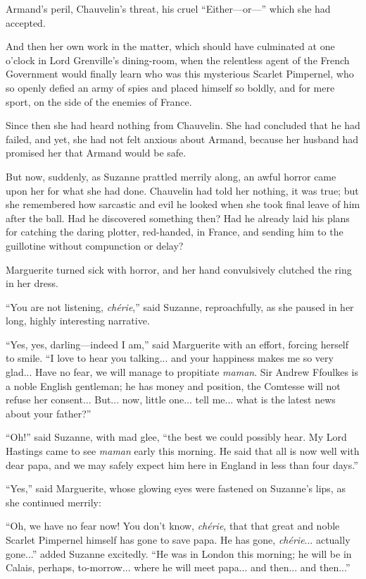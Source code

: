 \documentclass[paper=5.5in:8.5in,BCOR=7mm,twoside,DIV=calc,12pt,usegeometry,chapterprefix,endperiod,headings=big]{scrbook}
\begin{document}
Armand's peril, Chauvelin's threat, his cruel \enquote{Either---or---} which she had accepted.

And then her own work in the matter, which should have culminated at one o'clock in Lord Grenville's dining-room, when the relentless agent of the French Government would finally learn who was this mysterious Scarlet Pimpernel, who so openly defied an army of spies and placed himself so boldly, and for mere sport, on the side of the enemies of France.

Since then she had heard nothing from Chauvelin. She had concluded that he had failed, and yet, she had not felt anxious about Armand, because her husband had promised her that Armand would be safe.

But now, suddenly, as Suzanne prattled merrily along, an awful horror came upon her for what she had done. Chauvelin had told her nothing, it was true; but she remembered how sarcastic and evil he looked when she took final leave of him after the ball. Had he discovered something then? Had he already laid his plans for catching the daring plotter, red-handed, in France, and sending him to the guillotine without compunction or delay?

Marguerite turned sick with horror, and her hand convulsively clutched the ring in her dress.

\enquote{You are not listening, \textit{chérie},} said Suzanne, reproachfully, as she paused in her long, highly interesting narrative.

\enquote{Yes, yes, darling---indeed I am,} said Marguerite with an effort, forcing herself to smile. \enquote{I love to hear you talking... and your happiness makes me so very glad... Have no fear, we will manage to propitiate \textit{maman}. Sir Andrew Ffoulkes is a noble English gentleman; he has money and position, the Comtesse will not refuse her consent... But... now, little one... tell me... what is the latest news about your father?}

\enquote{Oh!} said Suzanne, with mad glee, \enquote{the best we could possibly hear. My Lord Hastings came to see \textit{maman} early this morning. He said that all is now well with dear papa, and we may safely expect him here in England in less than four days.}

\enquote{Yes,} said Marguerite, whose glowing eyes were fastened on Suzanne's lips, as she continued merrily:

\enquote{Oh, we have no fear now! You don't know, \textit{chérie}, that that great and noble Scarlet Pimpernel himself has gone to save papa. He has gone, \textit{chérie}... actually gone...} added Suzanne excitedly. \enquote{He was in London this morning; he will be in Calais, perhaps, to-morrow... where he will meet papa... and then... and then...}
\end{document}
